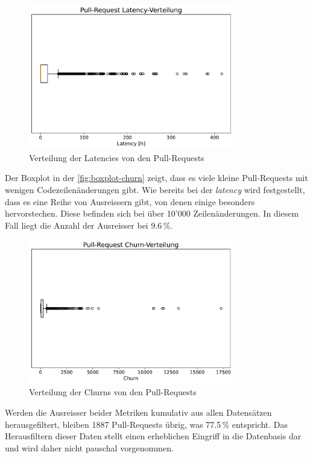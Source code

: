 \begin{figure}[htbp]
    \includegraphics[width=0.8\textwidth]{Figures/boxplot-latency.pdf}
    \centering
    \caption{Verteilung der Latencies von den Pull-Requests}
    \label{fig:boxplot-latency}
\end{figure}
 \newpage
Der Boxplot in der \autoref{fig:boxplot-churn} zeigt, dass es viele kleine Pull-Requests mit wenigen Codezeilenänderungen gibt. Wie bereits bei der \textit{latency} wird festgestellt, dass es eine Reihe von Ausreissern gibt, von denen einige besonders hervorstechen. Diese befinden sich bei über 10'000 Zeilenänderungen. In diesem Fall liegt die Anzahl der Ausreisser bei 9.6\,\%.

\begin{figure}[htbp]
    \includegraphics[width=0.8\textwidth]{Figures/boxplot-churn.pdf}
      \centering
    \caption{Verteilung der Churns von den Pull-Requests}
    \label{fig:boxplot-churn}
\end{figure}

Werden die Ausreisser beider Metriken kumulativ aus allen Datensätzen herausgefiltert, bleiben 1887 Pull-Requests übrig, was 77.5\,\% entspricht. Das Herausfiltern dieser Daten stellt einen erheblichen Eingriff in die Datenbasis dar und wird daher nicht pauschal vorgenommen.

